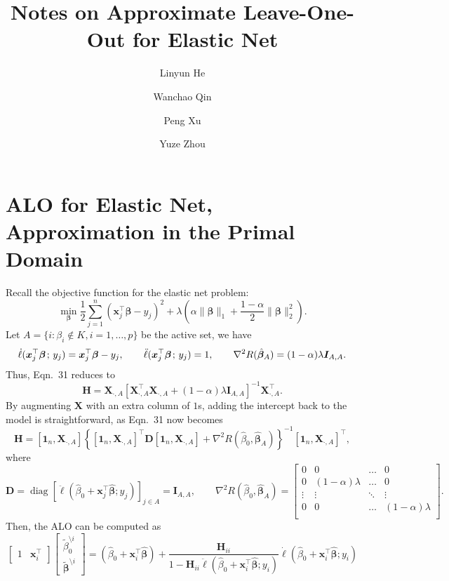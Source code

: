 \documentclass[11pt]{article}
\title{Notes on Approximate Leave-One-Out for Elastic Net}
\author{Linyun He \and Wanchao Qin \and Peng Xu \and Yuze Zhou}
\newcommand{\bx}{\bm{x}}
\newcommand{\bH}{\bm{H}}
\newcommand{\bI}{\bm{I}}
\newcommand{\bX}{\bm{X}}
\newcommand{\bbeta}{\bm{\beta}}
\newcommand{\semicol}{\nobreak\mskip2mu\mathpunct{}\nonscript\mkern-\thinmuskip{;}\mskip6muplus1mu\relax}
\DeclareMathOperator{\diag}{diag}
\newcommand{\refthm}[2]{#1~#2}
\begin{document}
\maketitle

\section{ALO for Elastic Net, Approximation in the Primal Domain}
Recall the objective function for the elastic net problem:
	\begin{equation}
	\min_{\bbeta}\frac{1}{2}\sum_{j=1}^{n}(\bx_j^\top\bbeta-y_j)^2+\lambda\left(\alpha\|\bbeta\|_1+\frac{1-\alpha}{2}\|\bbeta\|_2^2\right).
	\end{equation}
Let \(A=\{i:\beta_i\not\in K,i=1,\dotsc,p\}\) be the active set, we have \[\dot{\ell}(\bx_j^\top\bbeta\semicol y_j)=\bx_j^\top\bbeta-y_j,\qquad\ddot{\ell}(\bx_j^\top\bbeta\semicol y_j)=1,\qquad\nabla^2 R(\hat{\bbeta}_A)=(1-\alpha)\lambda\bI_{A,A}.\] Thus, \refthm{Eqn.}{31} reduces to
	\begin{equation}
	\bH=\bX_{\cdot,A}\left[\bX_{\cdot,A}^\top\bX_{\cdot,A}+\left(1-\alpha\right)\lambda\bI_{A,A}\right]^{-1}\bX_{\cdot,A}^\top.
	\end{equation}
By augmenting \(\bX\) with an extra column of \(1\)s, adding the intercept back to the model is straightforward, as \refthm{Eqn.}{31} now becomes 
	\begin{equation}
	\bm{H}=\left[\bm{1}_n,\bm{X}_{\cdot, A}\right]\left\{\left[\bm{1}_n,\bm{X}_{\cdot, A}\right]^\top\bm{D}\left[\bm{1}_n,\bm{X}_{\cdot, A}\right]+\nabla^2R\left(\hat{\beta}_0,\hat{\bm{\beta}}_A\right)\right\}^{-1}\left[\bm{1}_n,\bm{X}_{\cdot, A}\right]^\top,
	\end{equation}
where \[\bm{D}=\diag\left[\ddot{\ell}\left(\hat{\beta}_0+\bm{x}_j^\top\hat{\bm{\beta}};y_j\right)\right]_{j\in A}=\bI_{A,A},\qquad\nabla^2R\left(\hat{\beta}_0,\hat{\bm{\beta}}_A\right)=\begin{bmatrix}
0 & 0 & \dots & 0 \\
0 & (1-\alpha)\lambda & \dots & 0\\
\vdots & \vdots & \ddots & \vdots\\
0 & 0 & \dots & (1-\alpha)\lambda \\
\end{bmatrix}.\] Then, the ALO can be computed as
	\begin{equation}
	\begin{bmatrix}
	1 & \bm{x}_i^\top\end{bmatrix}
	\begin{bmatrix}
	\tilde{\beta}_0^{\setminus i} \\
	\tilde{\bm{\beta}}^{\setminus i}\end{bmatrix}=(\hat{\beta}_0+\bm{x}_i^\top\hat{\bm{\beta}})+\frac{\bH_{ii}}{1-\bH_{ii}\ddot{\ell}\left(\hat{\beta}_0+\bm{x}_i^\top\hat{\bm{\beta}};y_i\right)}\dot{\ell}\left(\hat{\beta}_0+\bm{x}_i^\top\hat{\bm{\beta}};y_i\right)
	\end{equation}
\end{document}

